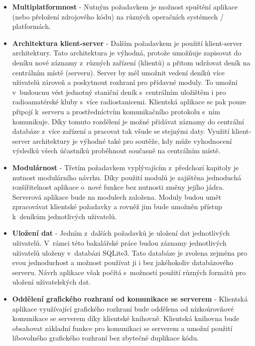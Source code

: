 \begin{itemize}
\item \textbf{Multiplatformnost} - Nutným požadavkem je možnost spuštění
aplikace (nebo přeložení zdrojového kódu) na různých operačních systémech / platformách.
\item \textbf{Architektura klient-server} - Dalším požadavkem je použití klient-server
architektury. Tato architektura je výhodná, protože umožňuje zapisovat do deníku
nové záznamy z~různých zařízení (klientů) a přitom udržovat deník na centrálním místě (serveru).
Server by měl umožnit vedení deníků více uživatelů zároveň a poskytnout rozhraní pro přídavné moduly.
To umožní v~budoucnu vést jednotný staniční deník s~centrálním uložištěm i pro radioamatérské
kluby s~více radiostanicemi.
Klientská aplikace se pak pouze připojí k~serveru a prostředníctvím komunikačního protokolu s~ním komunikuje.
Díky tomuto rozdělení je možné přidávat záznamy do centrální databáze z~více zařízení a pracovat
tak všude se stejnými daty. Využití klient-server architektury je výhodné také pro soutěže, kdy může vyhodnocení
výsledků všech účastníků proběhnout současně na centrálním místě.
\item \textbf{Modulárnost} - Třetím požadavkem vyplývajícím z~předchozí kapitoly je nutnost modulárního návrhu.
Díky použití modulů je zajištěna jednoduchá rozšířitelnost aplikace o~nové funkce bez nutnosti změny jejího jádra.
Serverová aplikace bude na modulech založena. Moduly budou umět zpracovávat klientské požadavky a rovněž jim bude umožněn
přístup k~deníkům jednotlivých uživatelů. 
\item \textbf{Uložení dat} - Jedním z~dalších požadavků je uložení dat jednotlivých uživatelů.
 V~rámci této bakalářské práce budou záznamy
jednotlivých uživatelů uloženy v~databázi SQLite3. Tato databáze je zvolena zejména pro svou jednoduchost a 
možnost používat ji i bez jakéhokoliv databázového serveru.
 Návrh aplikace
však počítá s~možností použití různých formátů pro uložení uživatelských dat.
\item \textbf{Oddělení grafického rozhraní od komunikace se serverem} - Klientská aplikace využívající grafického rozhraní
bude oddělena od nízkoúrovňové komunikace se serverem díky klientské knihovně. Klientská knihovna bude obsahovat základní funkce
pro komunikaci se serverem a umožní použití libovolného grafického rozhraní bez zbytečné duplikace kódu.
\end{itemize}


